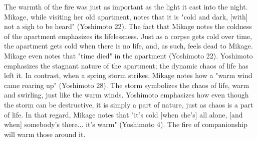 \documentclass[12pt,a4paper]{article}
\begin{document}
    The warmth of the fire was just as important as the light it cast into the night.
    Mikage, while visiting her old apartment, notes that it is "cold and dark, [with] not
    a sigh to be heard" (Yoshimoto 22). The fact that Mikage notes the coldness of
    the apartment emphasizes its lifelessness. Just as a corpse gets cold over time,
    the apartment gets cold when there is no life, and, as such, feels dead to Mikage.
    Mikage even notes that "time died" in the apartment (Yoshimoto 22). Yoshimoto
    emphasizes the stagnant nature of the apartment; the dynamic chaos of life has
    left it. In contrast, when a spring storm strikes, Mikage notes how
    a "warm wind came roaring up" (Yoshimoto 28). The storm symbolizes the chaos of
    life, warm and swirling, just like the warm winds. Yoshimoto emphasizes how even
    though the storm can be destructive, it is simply a part of nature, just as chaos
    is a part of life. In that regard, Mikage notes that "it's cold [when she's] all alone,
    [and when] somebody's there... it's warm" (Yoshimoto 4). The fire of companionship
    will warm those around it.
\end{document}
